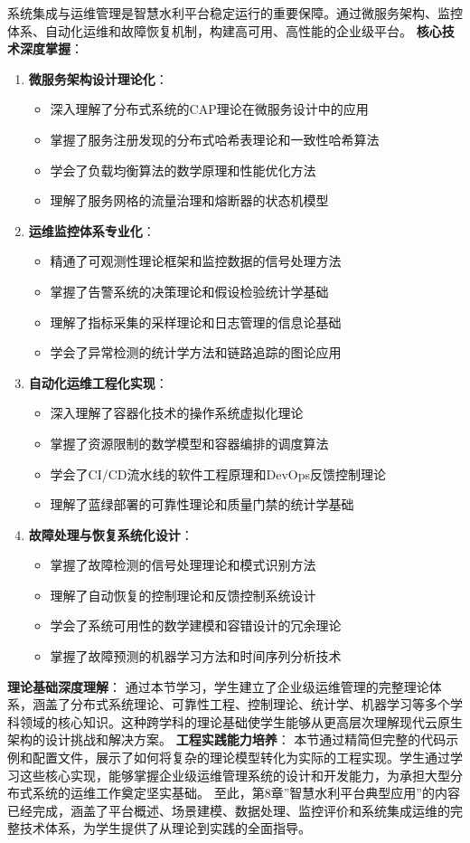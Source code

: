 {系统集成与运维管理是智慧水利平台稳定运行的重要保障。通过微服务架构、监控体系、自动化运维和故障恢复机制，构建高可用、高性能的企业级平台。 \textbf{核心技术深度掌握}： \begin{enumerate}
\def\labelenumi{\arabic{enumi}.} \tightlist \item \textbf{微服务架构设计理论化}： \begin{itemize} \tightlist \item
深入理解了分布式系统的CAP理论在微服务设计中的应用 \item 掌握了服务注册发现的分布式哈希表理论和一致性哈希算法 \item 学会了负载均衡算法的数学原理和性能优化方法 \item 理解了服务网格的流量治理和熔断器的状态机模型
\end{itemize} \item \textbf{运维监控体系专业化}： \begin{itemize} \tightlist \item 精通了可观测性理论框架和监控数据的信号处理方法 \item
掌握了告警系统的决策理论和假设检验统计学基础 \item 理解了指标采集的采样理论和日志管理的信息论基础 \item 学会了异常检测的统计学方法和链路追踪的图论应用 \end{itemize} \item
\textbf{自动化运维工程化实现}： \begin{itemize} \tightlist \item 深入理解了容器化技术的操作系统虚拟化理论 \item 掌握了资源限制的数学模型和容器编排的调度算法 \item
学会了CI/CD流水线的软件工程原理和DevOps反馈控制理论 \item 理解了蓝绿部署的可靠性理论和质量门禁的统计学基础 \end{itemize} \item \textbf{故障处理与恢复系统化设计}：
\begin{itemize} \tightlist \item 掌握了故障检测的信号处理理论和模式识别方法 \item 理解了自动恢复的控制理论和反馈控制系统设计 \item 学会了系统可用性的数学建模和容错设计的冗余理论 \item
掌握了故障预测的机器学习方法和时间序列分析技术 \end{itemize} \end{enumerate} \textbf{理论基础深度理解}：
通过本节学习，学生建立了企业级运维管理的完整理论体系，涵盖了分布式系统理论、可靠性工程、控制理论、统计学、机器学习等多个学科领域的核心知识。这种跨学科的理论基础使学生能够从更高层次理解现代云原生架构的设计挑战和解决方案。
\textbf{工程实践能力培养}： 本节通过精简但完整的代码示例和配置文件，展示了如何将复杂的理论模型转化为实际的工程实现。学生通过学习这些核心实现，能够掌握企业级运维管理系统的设计和开发能力，为承担大型分布式系统的运维工作奠定坚实基础。
至此，第8章''智慧水利平台典型应用''的内容已经完成，涵盖了平台概述、场景建模、数据处理、监控评价和系统集成运维的完整技术体系，为学生提供了从理论到实践的全面指导。
}
